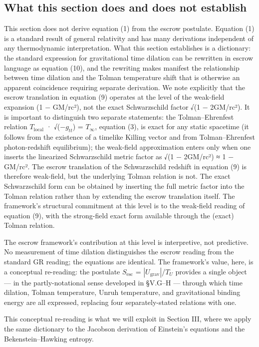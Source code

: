 \documentclass[11pt]{article}
\begin{document}
\subsection{What this section does and does not establish}

This section does not derive equation (1) from the escrow postulate.
Equation (1) is a standard result of general relativity and has many
derivations independent of any thermodynamic interpretation. What this
section establishes is a dictionary: the standard expression for
gravitational time dilation can be rewritten in escrow language as
equation (10), and the rewriting makes manifest the relationship between
time dilation and the Tolman temperature shift that is otherwise an
apparent coincidence requiring separate derivation. We note explicitly
that the escrow translation in equation (9) operates at the level of the
weak-field expansion (1 − GM/rc²), not the exact Schwarzschild factor
√(1 − 2GM/rc²). It is important to distinguish two separate statements:
the Tolman--Ehrenfest relation $T_{\mathrm{local}}$ · √(−$g_{tt}$) = $T_{\infty}$, equation (3),
is exact for any static spacetime (it follows from the existence of a
timelike Killing vector and from Tolman--Ehrenfest photon-redshift
equilibrium); the weak-field approximation enters only when one inserts
the linearized Schwarzschild metric factor as √(1 − 2GM/rc²) ≈ 1 −
GM/rc². The escrow translation of the Schwarzschild redshift in equation
(9) is therefore weak-field, but the underlying Tolman relation is not.
The exact Schwarzschild form can be obtained by inserting the full
metric factor into the Tolman relation rather than by extending the
escrow translation itself. The framework's structural commitment at
this level is to the weak-field reading of equation (9), with the
strong-field exact form available through the (exact) Tolman relation.

The escrow framework's contribution at this level is interpretive, not
predictive. No measurement of time dilation distinguishes the escrow
reading from the standard GR reading; the equations are identical. The
framework's value, here, is a conceptual re-reading: the postulate
$S_{\mathrm{esc}}$ = $|U_{\mathrm{grav}}|$/$T_{U}$ provides a single object --- in the
partly-notational sense developed in §V.G--H --- through which time
dilation, Tolman temperature, Unruh temperature, and gravitational
binding energy are all expressed, replacing four separately-stated
relations with one.

This conceptual re-reading is what we will exploit in Section III, where
we apply the same dictionary to the Jacobson derivation of Einstein's
equations and the Bekenstein--Hawking entropy.
\end{document}
